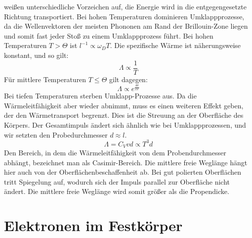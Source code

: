 \documentclass[11pt]{article}
\begin{document}
weißen unterschiedliche Vorzeichen auf, die Energie wird in die entgegengesetzte
Richtung transportiert. Bei hohen Temperaturen dominieren Umklappprozesse, da
die Wellenvektoren der meisten Phononen am Rand der Brillouin-Zone liegen und
somit fast jeder Stoß zu einem Umklappprozess führt. Bei hohen Temperaturen
$T>\Theta$ ist $l^{-1}\propto \omega_DT$. Die spezifische Wärme ist näherungsweise
konstant, und so gilt:
\begin{equation}
  \Lambda \propto\frac{1}{T}
\end{equation}
Für mittlere Temperaturen $T\leq\Theta$ gilt dagegen:
\begin{equation}
  \Lambda\propto e^{\frac{\Theta}{2T}}
\end{equation}
Bei tiefen Temperaturen sterben Umklapp-Prozesse aus. Da die Wärmeleitfähigkeit
aber wieder abnimmt, muss es einen weiteren Effekt geben, der den Wärmetransport
begrenzt. Dies ist die Streuung an der Oberfläche des Körpers. Der Gesamtimpuls
ändert sich ähnlich wie bei Umklappprozessen, und wir setzten den
Probedurchmesser $d\approx l$.
\begin{equation}
  \Lambda=C_Vvd\propto T^3d
\end{equation}
Den Bereich, in dem die Wärmeleitfähigkeit von dem Probendurchmesser abhängt,
bezeichnet man als Casimir-Bereich. Die mittlere freie Weglänge hängt hier auch
von der Oberflächenbeschaffenheit ab. Bei gut polierten Oberflächen tritt
Spiegelung auf, wodurch sich der Impuls parallel zur Oberfläche nicht ändert.
Die mittlere freie Weglänge wird somit größer als die Propendicke.
\section{Elektronen im Festkörper}
\end{document}
